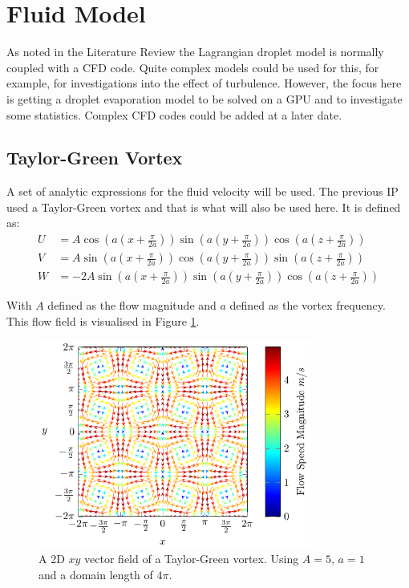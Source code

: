 \documentclass[../Interim_Report_Master]{subfiles}
\begin{document}
\hypertarget{fluid_mod}{\section{Fluid Model}\label{fluid_mod}}
As noted in the Literature Review the Lagrangian droplet model is normally coupled with a CFD code. Quite complex models could be used for this, for example, for investigations into the effect of turbulence. However, the focus here is getting a droplet evaporation model to be solved on a GPU and to investigate some statistics. Complex CFD codes could be added at a later date.

\subsection{Taylor-Green Vortex}
A set of analytic expressions for the fluid velocity will be used. The previous IP used a Taylor-Green vortex and that is what will also be used here. It is defined as:
\begin{subequations}
\begin{align}
U &= A\cos\left(a\left(x+\frac{\pi}{2a}\right)\right) \sin\left(a\left(y+\frac{\pi}{2a}\right)\right) \cos\left(a\left(z+\frac{\pi}{2a}\right)\right) \\
V &= A\sin\left(a\left(x+\frac{\pi}{2a}\right)\right) \cos\left(a\left(y+\frac{\pi}{2a}\right)\right) \sin\left(a\left(z+\frac{\pi}{2a}\right)\right) \\
W &= -2A\sin\left(a\left(x+\frac{\pi}{2a}\right)\right) \sin\left(a\left(y+\frac{\pi}{2a}\right)\right) \cos\left(a\left(z+\frac{\pi}{2a}\right)\right)
\end{align}
\end{subequations}

With $A$ defined as the flow magnitude and $a$ defined as the vortex frequency. This flow field is visualised in Figure \ref{tgv_plot}.
\begin{figure}
	\centering
	\includegraphics[width=0.8\textwidth]{./Diagrams/taylor_green_vortex.pdf}
	\caption{A 2D $xy$ vector field of a Taylor-Green vortex. Using $A=5$, $a=1$ and a domain length of $4\pi$.}
	\label{tgv_plot}
\end{figure}
\end{document}
